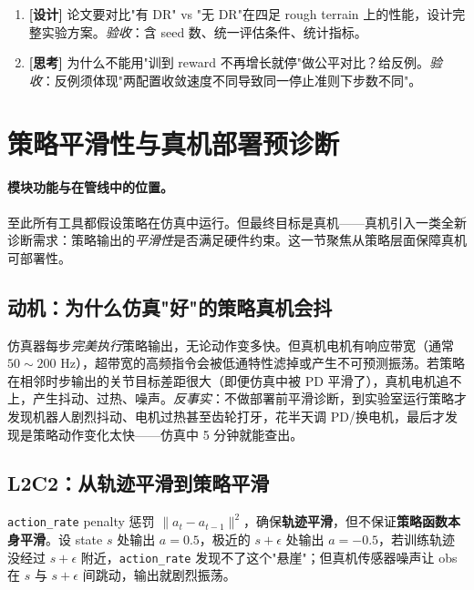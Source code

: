 \begin{practice}[本节动手任务]
\begin{enumerate}
  \item \textbf{[设计]} 论文要对比"有 DR" vs "无 DR"在四足 rough terrain 上的性能，设计完整实验方案。\emph{验收}：含 seed 数、统一评估条件、统计指标。
  \item \textbf{[思考]} 为什么不能用"训到 reward 不再增长就停"做公平对比？给反例。\emph{验收}：反例须体现"两配置收敛速度不同导致同一停止准则下步数不同"。
\end{enumerate}
\end{practice}

\section{策略平滑性与真机部署预诊断}
\label{sec:rlmc-diag-deploy}

\paragraph{模块功能与在管线中的位置。}至此所有工具都假设策略在仿真中运行。但最终目标是真机——真机引入一类全新诊断需求：策略输出的\emph{平滑性}是否满足硬件约束。这一节聚焦从策略层面保障真机可部署性。

\subsection{动机：为什么仿真"好"的策略真机会抖}

仿真器每步\emph{完美执行}策略输出，无论动作变多快。但真机电机有响应带宽（通常 $50\sim200$ Hz），超带宽的高频指令会被低通特性滤掉或产生不可预测振荡。若策略在相邻时步输出的关节目标差距很大（即便仿真中被 PD 平滑了），真机电机追不上，产生抖动、过热、噪声。\emph{反事实}：不做部署前平滑诊断，到实验室运行策略才发现机器人剧烈抖动、电机过热甚至齿轮打牙，花半天调 PD/换电机，最后才发现是策略动作变化太快——仿真中 5 分钟就能查出。

\subsection{L2C2：从轨迹平滑到策略平滑}

\verb|action_rate| penalty 惩罚 $\|a_t-a_{t-1}\|^2$，确保\textbf{轨迹平滑}，但不保证\textbf{策略函数本身平滑}。设 state $s$ 处输出 $a=0.5$，极近的 $s+\epsilon$ 处输出 $a=-0.5$，若训练轨迹没经过 $s+\epsilon$ 附近，\verb|action_rate| 发现不了这个"悬崖"；但真机传感器噪声让 obs 在 $s$ 与 $s+\epsilon$ 间跳动，输出就剧烈振荡。

